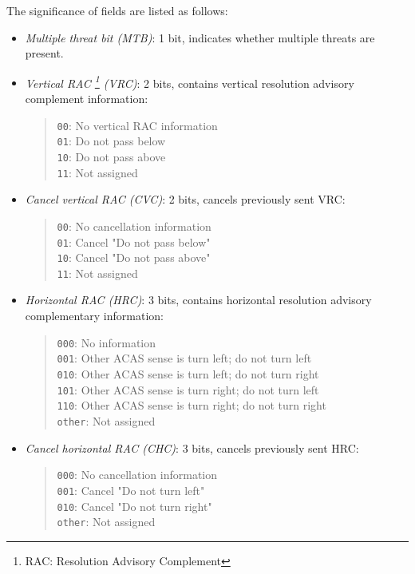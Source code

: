 The significance of fields are listed as follows:

\begin{itemize}
  \item \emph{Multiple threat bit (MTB)}: 1 bit, indicates whether multiple threats are present.

  \item \emph{Vertical RAC \footnote{RAC: Resolution Advisory Complement} (VRC)}: 2 bits, contains vertical resolution advisory complement information:
  \begin{quote}
    \small
    \texttt{00}: No vertical RAC information \\
    \texttt{01}: Do not pass below \\
    \texttt{10}: Do not pass above \\
    \texttt{11}: Not assigned
  \end{quote}

  \item \emph{Cancel vertical RAC (CVC)}: 2 bits, cancels previously sent VRC:
  \begin{quote}
    \small
    \texttt{00}: No cancellation information \\
    \texttt{01}: Cancel "Do not pass below" \\
    \texttt{10}: Cancel "Do not pass above" \\
    \texttt{11}: Not assigned
  \end{quote}

  \item \emph{Horizontal RAC (HRC)}: 3 bits, contains horizontal resolution advisory complementary information:
  \begin{quote}
    \small
    \texttt{000}: No information\\
    \texttt{001}: Other ACAS sense is turn left; do not turn left \\
    \texttt{010}: Other ACAS sense is turn left; do not turn right \\
    \texttt{101}: Other ACAS sense is turn right; do not turn left \\
    \texttt{110}: Other ACAS sense is turn right; do not turn right \\
    \texttt{other}: Not assigned
  \end{quote}

  \item \emph{Cancel horizontal RAC (CHC)}: 3 bits, cancels previously sent HRC:
  \begin{quote}
    \small
    \texttt{000}: No cancellation information \\
    \texttt{001}: Cancel "Do not turn left" \\
    \texttt{010}: Cancel "Do not turn right" \\
    \texttt{other}: Not assigned
  \end{quote}


\end{itemize}
